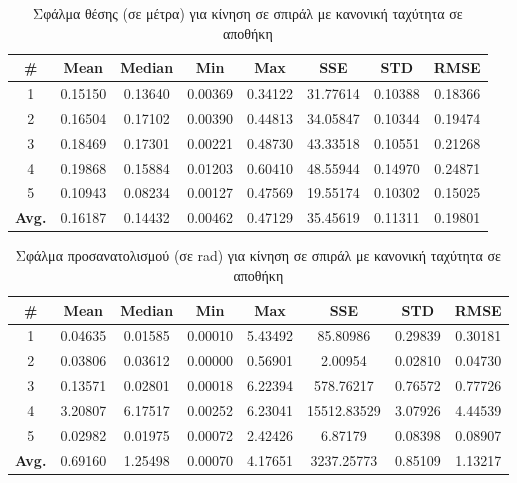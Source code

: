 \begin{table}[H]
    \begin{center}
        \centering
        \caption{Σφάλμα θέσης (σε μέτρα) για κίνηση σε σπιράλ με κανονική ταχύτητα σε αποθήκη}
        \label{tab:position_error_spiral_normal_warehouse}
        \begin{tabular}{| c | c | c | c | c | c | c | c | }
        \hline
        \rowcolor{Gray}
        \# & Mean & Median & Min & Max & SSE & STD & RMSE \\
        \hline
        1 & 0.15150 & 0.13640 & 0.00369 & 0.34122 & 31.77614 & 0.10388 & 0.18366 \\
        2 & 0.16504 & 0.17102 & 0.00390 & 0.44813 & 34.05847 & 0.10344 & 0.19474 \\
        3 & 0.18469 & 0.17301 & 0.00221 & 0.48730 & 43.33518 & 0.10551 & 0.21268 \\
        4 & 0.19868 & 0.15884 & 0.01203 & 0.60410 & 48.55944 & 0.14970 & 0.24871 \\
        5 & 0.10943 & 0.08234 & 0.00127 & 0.47569 & 19.55174 & 0.10302 & 0.15025 \\
        \hline
        \textbf{Avg.} & 0.16187 & 0.14432 & 0.00462 & 0.47129 & 35.45619 & 0.11311 & 0.19801 \\
        \hline
        \end{tabular}
    \end{center}
\end{table}

\begin{table}[H]
    \begin{center}
        \centering
        \caption{Σφάλμα προσανατολισμού (σε rad) για κίνηση σε σπιράλ με κανονική ταχύτητα σε αποθήκη}
        \label{tab:orientation_error_spiral_normal_warehouse}
        \begin{tabular}{| c | c | c | c | c | c | c | c | }
        \hline
        \rowcolor{Gray}
        \# & Mean & Median & Min & Max & SSE & STD & RMSE \\
        \hline
        1 & 0.04635 & 0.01585 & 0.00010 & 5.43492 & 85.80986 & 0.29839 & 0.30181 \\
        2 & 0.03806 & 0.03612 & 0.00000 & 0.56901 & 2.00954 & 0.02810 & 0.04730 \\
        3 & 0.13571 & 0.02801 & 0.00018 & 6.22394 & 578.76217 & 0.76572 & 0.77726 \\
        4 & 3.20807 & 6.17517 & 0.00252 & 6.23041 & 15512.83529 & 3.07926 & 4.44539 \\
        5 & 0.02982 & 0.01975 & 0.00072 & 2.42426 & 6.87179 & 0.08398 & 0.08907 \\
        \hline
        \textbf{Avg.} & 0.69160 & 1.25498 & 0.00070 & 4.17651 & 3237.25773 & 0.85109 & 1.13217 \\
        \hline
        \end{tabular}
    \end{center}
\end{table}

